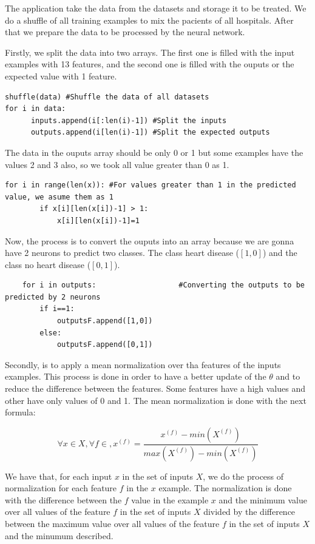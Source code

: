 \documentclass[12pt]{article}
\begin{document}
The application take the data from the datasets and storage it to be treated. We do a shuffle of all training examples to mix the pacients of all hospitals. After that we prepare the data to be processed by the neural network.

Firstly, we split the data into two arrays. The first one is filled with the input examples with 13 features, and the second one is filled with the ouputs or the expected value with 1 feature. 

\begin{lstlisting}
shuffle(data) #Shuffle the data of all datasets
for i in data:
      inputs.append(i[:len(i)-1]) #Split the inputs
      outputs.append(i[len(i)-1]) #Split the expected outputs
\end{lstlisting}

The data in the ouputs array should be only 0 or 1 but some examples have the values 2 and 3 also, so we took all value greater than 0 as 1.

\begin{lstlisting}
for i in range(len(x)): #For values greater than 1 in the predicted value, we asume them as 1
        if x[i][len(x[i])-1] > 1:
            x[i][len(x[i])-1]=1
\end{lstlisting}

Now, the process is to convert the ouputs into an array because we are gonna have 2 neurons to predict two classes. The class heart disease ($[1,0]$) and the class no heart disease ($[0,1]$).

\begin{lstlisting}
    for i in outputs:                   #Converting the outputs to be predicted by 2 neurons
        if i==1:
            outputsF.append([1,0])
        else:
            outputsF.append([0,1])
\end{lstlisting}

Secondly, is to apply a mean normalization over tha features of the inputs examples. This process is done in order to have a better update of the $\theta$ and to reduce the difference between the features. Some features have a high values and other have only values of 0 and 1. The mean normalization is done with the next formula:

\begin{equation}
   \forall x \in X, \forall f \in, x^{(f)}= \frac{x^{(f)}-min(X^{(f)})}{max(X^{(f)})-min(X^{(f)})}
\end{equation}

We have that, for each input $x$ in the set of inputs $X$,  we do the process of normalization for each feature $f$ in the $x$ example. The normalization is done with the difference between the $f$ value in the example $x$ and the minimum value over all values of the feature $f$ in the set of inputs $X$ divided by the difference between the maximum value over all values of the feature $f$ in the set of inputs $X$ and the minumum described.
\end{document}
